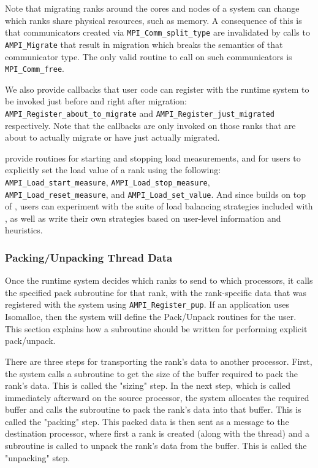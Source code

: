 \documentclass[10pt]{article}
\begin{document}
Note that migrating ranks around the cores and nodes of a system can change which
ranks share physical resources, such as memory. A consequence of this is that communicators created
via \texttt{MPI\_Comm\_split\_type} are invalidated by calls to \texttt{AMPI\_Migrate} that result
in migration which breaks the semantics of that communicator type. The only valid routine to call on
such communicators is \texttt{MPI\_Comm\_free}.

We also provide callbacks that user code can register with the runtime system
to be invoked just before and right after migration:
\texttt{AMPI\_Register\_about\_to\_migrate} and
\texttt{AMPI\_Register\_just\_migrated} respectively. Note that the callbacks
are only invoked on those ranks that are about to actually migrate or have
just actually migrated.

\ampi{} provide routines for starting and stopping load measurements, and for
users to explicitly set the load value of a rank using the following:
\texttt{AMPI\_Load\_start\_measure}, \texttt{AMPI\_Load\_stop\_measure},
\texttt{AMPI\_Load\_reset\_measure}, and \texttt{AMPI\_Load\_set\_value}.
And since \ampi{} builds on top of \charmpp{},
users can experiment with the suite of load balancing strategies included with
\charmpp{}, as well as write their own strategies based on user-level
information and heuristics.

\subsubsection{Packing/Unpacking Thread Data}

Once the \ampi{} runtime system decides which ranks to send to which
processors, it calls the specified pack subroutine for that rank, with the
rank-specific data that was registered with the system using
\texttt{AMPI\_Register\_pup}. If an \ampi{} application uses Isomalloc, then
the system will define the Pack/Unpack routines for the user. This section
explains how a subroutine should be written for performing explicit pack/unpack.

There are three steps for transporting the rank's data to another processor.
First, the system calls a subroutine to get the size of the buffer required to
pack the rank's data. This is called the "sizing" step. In the next step,
which is called immediately afterward on the source processor, the system
allocates the required buffer and calls the subroutine to pack the rank's data
into that buffer. This is called the "packing" step. This packed data is then
sent as a message to the destination processor, where first a rank is created
(along with the thread) and a subroutine is called to unpack the rank's data
from the buffer. This is called the "unpacking" step.
\end{document}
